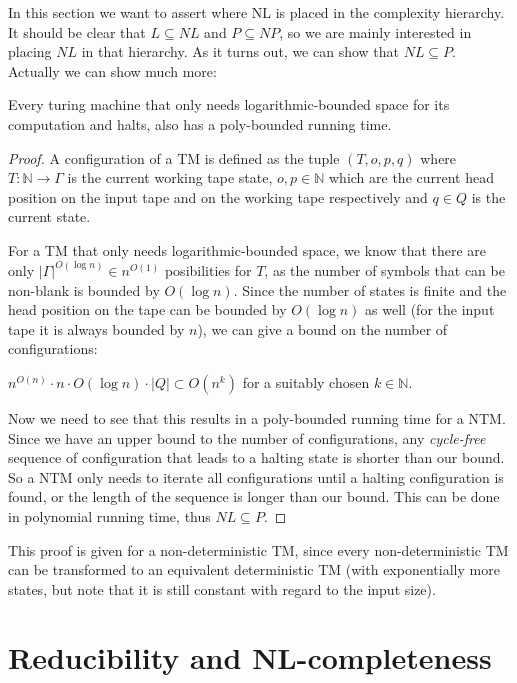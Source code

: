 In this section we want to assert where NL is placed in the complexity
hierarchy. It should be clear that $L \subseteq NL$ and
$P \subseteq NP$, so we are mainly interested in placing $NL$ in that
hierarchy. As it turns out, we can show that $NL \subseteq P$. Actually
we can show much more: \vspace{0.5cm}

\begin{thm}
\label{poly-running-time}
Every turing machine that only needs logarithmic-bounded space for its computation and halts, also has a poly-bounded running time.
\end{thm}

\begin{proof}
A configuration of a TM is defined as the tuple $(T, o, p, q)$ where $T: \mathbb{N} \longrightarrow \Gamma$ is the current working tape state,
$o, p \in \mathbb{N}$ which are the current head position on the input tape and on the working tape respectively and $q \in Q$ is the current state.

For a TM that only needs logarithmic-bounded space, we know that there are only $|\Gamma|^{O(\log n)} \in n^{O(1)}$ posibilities for $T$,
as the number of symbols that can be non-blank is bounded by $O(\log n)$. Since the number of states is finite and the head position on the tape
can be bounded by $O(\log n)$ as well (for the input tape it is always bounded by $n$), we can give a bound on the number of configurations:

$n^{O(n)} \cdot n \cdot O(\log n) \cdot |Q| \subset O(n^k)$ for a suitably chosen $k \in \mathbb{N}$.

Now we need to see that this results in a poly-bounded running time for a NTM.
Since we have an upper bound to the number of configurations, any {\em cycle-free} sequence of configuration that leads to a halting state
is shorter than our bound. So a NTM only needs to iterate all configurations until a halting configuration is found, or
the length of the sequence is longer than our bound.
This can be done in polynomial running time, thus $NL \subseteq P$.

\end{proof}

This proof is given for a non-deterministic TM, since every
non-deterministic TM can be transformed to an equivalent deterministic
TM (with exponentially more states, but note that it is still constant
with regard to the input size).

\section{Reducibility and
NL-completeness}\label{reducibility-and-nl-completeness}

